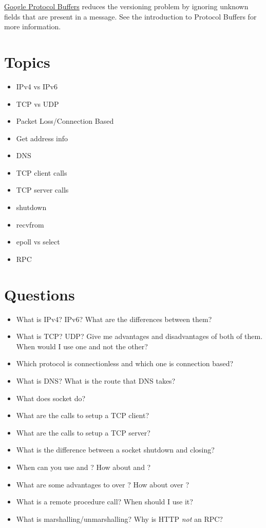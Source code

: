 \href{https://developers.google.com/protocol-buffers/docs/overview}{Google Protocol Buffers} reduces the versioning problem by ignoring unknown fields that are present in a message.
See the introduction to Protocol Buffers for more information.

\section{Topics}

\begin{itemize}
\tightlist
\item
  IPv4 vs IPv6
\item
  TCP vs UDP
\item
  Packet Loss/Connection Based
\item
  Get address info
\item
  DNS
\item
  TCP client calls
\item
  TCP server calls
\item
  shutdown
\item
  recvfrom
\item
  epoll vs select
\item
  RPC
\end{itemize}

\section{Questions}

\begin{itemize}
\tightlist
\item
  What is IPv4? IPv6? What are the differences between them?
\item
  What is TCP? UDP? Give me advantages and disadvantages of both of them.
  When would I use one and not the other?
\item
  Which protocol is connectionless and which one is connection based?
\item
  What is DNS? What is the route that DNS takes?
\item
  What does socket do?
\item
  What are the calls to setup a TCP client?
\item
  What are the calls to setup a TCP server?
\item
  What is the difference between a socket shutdown and closing?
\item
  When can you use  and ? How about  and ?
\item
  What are some advantages to  over ? How about  over ?
\item
  What is a remote procedure call? When should I use it?
\item
  What is marshalling/unmarshalling? Why is HTTP \emph{not} an RPC?
\end{itemize}



